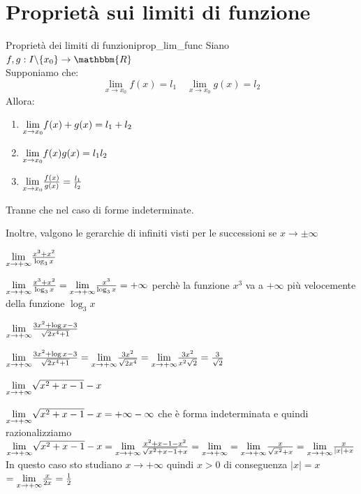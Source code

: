 \documentclass[12pt]{report}
\newcounter{theorem}
\newcounter{exercise}
\newcommand{\nmu}{}
\begin{document}
	\section{Proprietà sui limiti di funzione}
	\begin{theorem}{\nmu Proprietà dei limiti di funzioni}{prop_lim_func}
		Siano $f, g: I \backslash \{x_0\} \to \mathbbm{R}$ \\
		Supponiamo che:
		\[
		\lim_{x \to x_0}f(x) = l_1 \quad \lim_{x \to x_0}g(x) = l_2
		\]
		Allora:
		\begin{enumerate}
			\item $\mathlarger{\lim_{x \to x_0}}f(x) + g(x) = l_1 + l_2$
			\item $\mathlarger{\lim_{x \to x_0}}f(x)g(x) = l_1l_2$
			\item $\mathlarger{\lim_{x \to x_0}}\frac{f(x)}{g(x)}=\frac{l_1}{l_2}$
		\end{enumerate}
		Tranne che nel caso di forme indeterminate.
	\end{theorem}
	Inoltre, valgono le gerarchie di infiniti visti per le successioni se $x \to \pm\infty$
	\begin{assignment}{}{}
		$\mathlarger{\lim_{x \to +\infty}}\frac{x^3+x^2}{\log_{3}x}$
		\begin{exercise}{}{}
			$\mathlarger{\lim_{x \to +\infty}}\frac{x^3+x^2}{\log_{3}x} = \mathlarger{\lim_{x \to +\infty}}\frac{x^3}{\log_{3}x} = +\infty$
			perchè la funzione $x^3$ va a $+\infty$ più velocemente della funzione $\log_3{x}$
		\end{exercise}
	\end{assignment}
	\begin{assignment}{}{}
		$\mathlarger{\lim_{x \to +\infty}}\frac{3x^2+\log x - 3}{\sqrt{2x^4 + 1}}$
		\begin{exercise}{}{}
			$\mathlarger{\lim_{x \to +\infty}}\frac{3x^2+\log x - 3}{\sqrt{2x^4 + 1}} = \mathlarger{\lim_{x \to +\infty}}\frac{3x^2}{\sqrt{2x^4}} = \mathlarger{\lim_{x \to +\infty}}\frac{3x^2}{x^2\sqrt{2}} = \frac{3}{\sqrt{2}}$
		\end{exercise}
	\end{assignment}
	\begin{assignment}{}{}
		$\mathlarger{\lim_{x \to +\infty}}\sqrt{x^2 + x - 1} -x$
		\begin{exercise}{}{}
			$\mathlarger{\lim_{x \to +\infty}}\sqrt{x^2 + x - 1} -x = +\infty - \infty$ che è forma indeterminata e quindi razionalizziamo \\
			$\mathlarger{\lim_{x \to +\infty}}\sqrt{x^2 + x - 1} -x = \mathlarger{\lim_{x \to +\infty}}\frac{x^2 + x - 1 - x^2}{\sqrt{x^2 + x - 1} + x} = \mathlarger{\lim_{x \to +\infty}} = \mathlarger{\lim_{x \to +\infty}}\frac{x}{\sqrt{x^2} + x} = \mathlarger{\lim_{x \to +\infty}}\frac{x}{|x| + x}$ \\
			In questo caso sto studiano $x \to +\infty$ quindi $x>0$ di conseguenza $|x| = x$ \\
			$= \mathlarger{\lim_{x \to +\infty}}\frac{x}{2x} = \frac{1}{2}$
		\end{exercise}
	\end{assignment}
\end{document}
